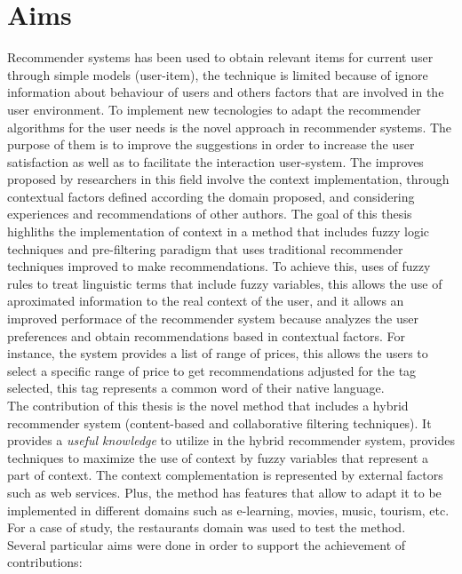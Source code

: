 \section{Aims}

Recommender systems has been used to obtain relevant items for current user
through simple models (user-item), the technique is limited 
because of ignore information about behaviour of users and others
factors that are involved in the user environment. 
To implement new tecnologies to adapt
the recommender algorithms for the user needs is the novel approach in
recommender systems. 
The purpose of them is to improve the suggestions in order to increase the user
satisfaction as well as to facilitate the interaction user-system.
The improves proposed by researchers in this field involve the context
implementation, through contextual factors defined according the domain 
proposed, and considering 
experiences and recommendations of other authors.
The goal of this thesis highliths the implementation of context in 
a method that includes fuzzy logic
techniques and pre-filtering paradigm that uses traditional recommender
techniques improved to make recommendations. To achieve this, 
uses of fuzzy rules to treat linguistic terms that include fuzzy variables, 
this allows the use of aproximated information 
to the real context of the user, and it allows an improved
performace of the recommender system because analyzes the user 
preferences and obtain recommendations
based in contextual factors. 
For instance, the system provides a list of
range of prices, this allows the users to select a specific range of
price to get recommendations adjusted for the tag selected, this tag represents
a common word of their native language.\\
The contribution of this thesis is the novel method that 
includes a hybrid recommender
system (content-based and collaborative filtering techniques). It
provides a \textit{useful knowledge} 
to utilize in the hybrid recommender system, provides techniques to 
maximize the use of context by fuzzy variables that represent a part
of context. The context complementation is represented by external factors
such as web services. 
Plus, the method has features that allow to adapt it to be
implemented in different domains such as e-learning, movies,
music, tourism, etc. For a case of study, the restaurants domain
was used to test the method.\\
Several particular aims were done in order to support the achievement 
of contributions:
